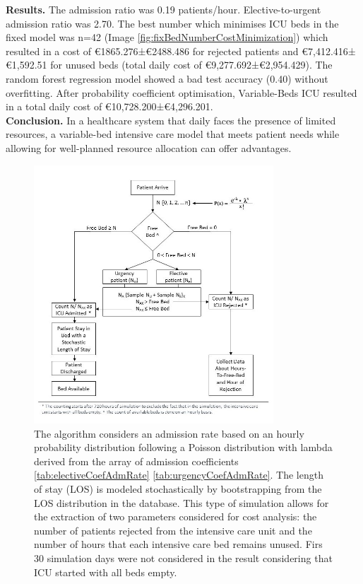 \documentclass[12pt]{article}
\begin{document}
{\noindent\textbf{Results. }The admission ratio was 0.19 patients/hour. Elective-to-urgent admission ratio was 2.70. The best number which minimises ICU beds in the fixed model was n=42 (Image \ref{fig:fixBedNumberCostMinimization}) which resulted in a cost of €1865.276±€2488.486 for rejected patients and €7,412.416±€1,592.51 for unused beds (total daily cost of €9,277.692±€2,954.429). The
random forest regression model showed a bad test accuracy (0.40) without overfitting. After probability coefficient optimisation, Variable-Beds ICU resulted in a total daily cost of €10,728.200±€4,296.201.\\

\noindent\textbf{Conclusion. }In a healthcare system that daily faces the presence of limited resources, a variable-bed intensive care model that meets patient needs while allowing for well-planned resource allocation can offer advantages.}\\


\begin{figure}[H]
\centering
\includegraphics[width=0.8\textwidth]{Image1.jpeg}
\caption{The algorithm considers an admission rate based on an hourly probability distribution following a Poisson distribution with lambda derived from the array of admission coefficients \ref{tab:electiveCoefAdmRate} \ref{tab:urgencyCoefAdmRate}. The length of stay (LOS) is modeled stochastically by bootstrapping from the LOS distribution in the database. This type of simulation allows for the extraction of two parameters considered for cost analysis: the number of patients rejected from the intensive care unit and the number of hours that each intensive care bed remains unused. Firs 30 simulation days were not considered in the result considering that ICU started with all beds empty.}
\label{fig:algSim}
\end{figure}
\end{document}
